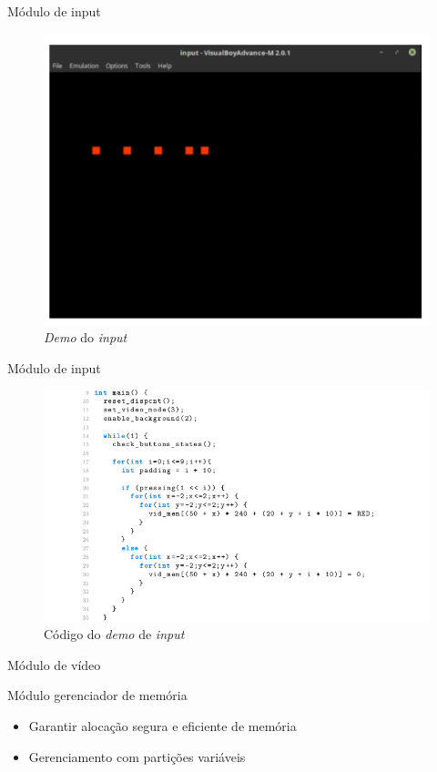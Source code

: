 \documentclass[notes, mathserif]{beamer}
\begin{document}
\begin{frame}{M\'odulo de input}
	\begin{figure}[H]
		\includegraphics[width=.7\linewidth]{figuras/input-demo.png}
		\centering
		\caption{\textit{Demo} do \textit{input}}
		\label{fig:inputdemo}
	\end{figure}
\end{frame}

\begin{frame}{M\'odulo de input}
	\begin{figure}[H]
		\includegraphics[width=.9\linewidth]{figuras/input-demo-codigo.png}
		\centering
		\caption{C\'odigo do \textit{demo} de \textit{input}}
		\label{fig:inputdemocode}
	\end{figure}
\end{frame}

\begin{frame}{M\'odulo de v\'ideo}
\end{frame}

\begin{frame}{M\'odulo gerenciador de mem\'oria}
	\begin{itemize}
		\item Garantir aloca\c c\~ao segura e eficiente de mem\'oria
		\item Gerenciamento com parti\c c\~oes vari\'aveis
	\end{itemize}
\end{frame}
\end{document}
